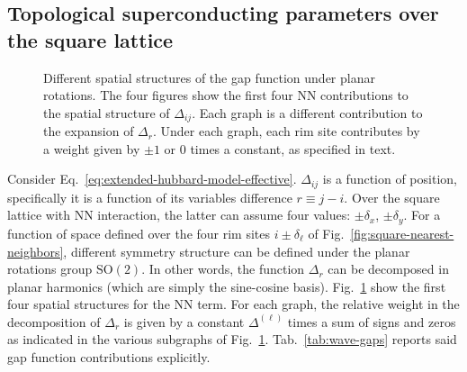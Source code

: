 \subsection{Topological superconducting parameters over the square lattice}

\begin{figure}
	\centering
	\subfloat[$p_x$-wave.]{
		
		\label{subfig:px-wave-gap}
	}
	\subfloat[$p_y$-wave.]{
		
		\label{subfig:py-wave-gap}
	}
	\subfloat[$d_{x^2-y^2}$-wave.]{
		
		\label{subfig:d-wave-gap}
	}
	\caption{Different spatial structures of the gap function under planar rotations. The four figures show the first four NN contributions to the spatial structure of $\Delta_{ij}$. Each graph is a different contribution to the expansion of $\Delta_r$. Under each graph, each rim site contributes by a weight given by $\pm 1$ or $0$ times a constant, as specified in text.}
	\label{fig:wave-gaps}
\end{figure}

Consider Eq.~\eqref{eq:extended-hubbard-model-effective}. $\Delta_{ij}$ is a function of position, specifically it is a function of its variables difference $r \equiv j-i$. Over the square lattice with NN interaction, the latter can assume four values: $\pm \delta_x$, $\pm \delta_y$. For a function of space defined over the four rim sites $i \pm \delta_\ell$ of Fig.~\ref{fig:square-nearest-neighbors}, different symmetry structure can be defined under the planar rotations group $\mathrm{SO}(2)$. In other words, the function $\Delta_r$  can be decomposed in planar harmonics (which are simply the sine-cosine basis). Fig.~\ref{fig:wave-gaps} show the first four spatial structures for the NN term. For each graph, the relative weight in the decomposition of $\Delta_r$ is given by a constant $\Delta^{(\ell)}$ times a sum of signs and zeros as indicated in the various subgraphs of Fig.~\ref{fig:wave-gaps}. Tab.~\ref{tab:wave-gaps} reports said gap function contributions explicitly.


